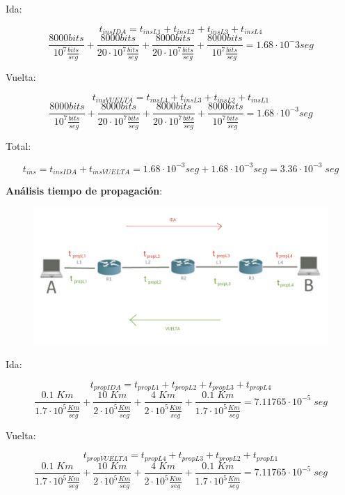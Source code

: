 \documentclass[titlepage,a4paper]{article}
\begin{document}
Ida:

$$ t_{insIDA} = t_{insL1} + t_{insL2} + t_{insL3} +t_{insL4} $$ 
$$\frac{8000 bits}{10^7 \frac{bits}{seg}}  + \frac{8000 bits}{20\cdot 10^7 \frac{bits}{seg}}  + \frac{8000 bits}{20\cdot 10^7 \frac{bits}{seg}} + \frac{8000 bits}{10^7 \frac{bits}{seg}} = 1.68 \cdot 10^-3 seg$$

Vuelta:

$$ t_{insVUELTA} = t_{insL4} + t_{insL3} + t_{insL2} +t_{insL1} $$ 
$$  \frac{8000 bits}{10^7 \frac{bits}{seg}}  + \frac{8000 bits}{20\cdot 10^7 \frac{bits}{seg}}  + \frac{8000 bits}{20\cdot 10^7 \frac{bits}{seg}} + \frac{8000 bits}{10^7 \frac{bits}{seg}} = 1.68 \cdot 10^{-3} seg $$

Total:

$$ t_{ins} = t_{insIDA} + t_{insVUELTA} =   1.68 \cdot 10^{-3} seg +  1.68 \cdot 10^{-3} seg =  3.36 \cdot 10^{-3} \; seg$$


\textbf{Análisis tiempo de propagación}: \\

\begin{figure}[H]
\centering
\includegraphics[width=\textwidth]{imagenes/tiempoPropagacion.png}
\end{figure}

Ida:

$$t_{propIDA} = t_{propL1} + t_{propL2}  + t_{propL3} + t_{propL4} $$ 
$$ \frac{0.1 \; Km}{1.7\cdot10^5\frac{Km}{seg}} + \frac{10 \; Km}{2\cdot10^5\frac{Km}{seg}} + \frac{4 \; Km}{2\cdot10^5\frac{Km}{seg}} + \frac{0.1 \; Km}{1.7\cdot10^5\frac{Km}{seg}} = 7.11765 \cdot 10^{-5} \; seg $$

Vuelta:

$$t_{propVUELTA} = t_{propL4} + t_{propL3} + t_{propL2} + t_{propL1} $$ 
$$ \frac{0.1 \; Km}{1.7\cdot10^5\frac{Km}{seg}} + \frac{10 \; Km}{2\cdot10^5\frac{Km}{seg}} + \frac{4 \; Km}{2\cdot10^5\frac{Km}{seg}} + \frac{0.1 \; Km}{1.7\cdot10^5\frac{Km}{seg}} = 7.11765 \cdot 10^{-5} \; seg  $$
\end{document}
